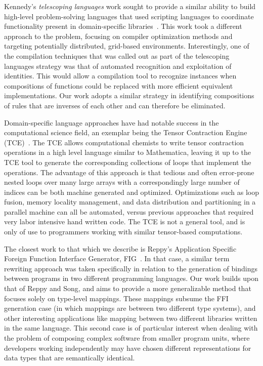 Kennedy's \emph{telescoping languages} work sought to provide a similar ability
to build high-level problem-solving languages that used scripting languages to
coordinate functionality present in domain-specific
libraries~\cite{kennedy00telescoping}. This work took a different approach to
the problem, focusing on compiler optimization methods and targeting potentially
distributed, grid-based environments. Interestingly, one of the compilation
techniques that was called out as part of the telescoping languages strategy was
that of automated recognition and exploitation of identities. This would allow a
compilation tool to recognize instances when compositions of functions could be
replaced with more efficient equivalent implementations. Our work adopts a
similar strategy in identifying compositions of rules that are inverses of each
other and can therefore be eliminated.

Domain-specific language approaches have had notable success in the
computational science field, an exemplar being the Tensor Contraction Engine
(TCE)~\cite{baumgartner05synthesis}. The TCE allows computational chemists to
write tensor contraction operations in a high level language similar to
Mathematica, leaving it up to the TCE tool to generate the corresponding
collections of loops that implement the operations. The advantage of this
approach is that tedious and often error-prone nested loops over many large
arrays with a correspondingly large number of indices can be both machine
generated and optimized. Optimizations such as loop fusion, memory locality
management, and data distribution and partitioning in a parallel machine can all
be automated, versus previous approaches that required very labor intensive hand
written code. The TCE is not a general tool, and is only of use to programmers
working with similar tensor-based computations.

The closest work to that which we describe is Reppy's Application Specific
Foreign Function Interface Generator, FIG~\cite{reppy06fig}. In that case, a
similar term rewriting approach was taken specifically in relation to the
generation of bindings between programs in two different programming languages.
Our work builds upon that of Reppy and Song, and aims to provide a more
generalizable method that focuses solely on type-level mappings. These mappings
subsume the FFI generation case (in which mappings are between two different
type systems), and other interesting applications like mapping between two
different libraries written in the same language. This second case is of
particular interest when dealing with the problem of composing complex software
from smaller program units, where developers working independently may have
chosen different representations for data types that are semantically identical.

